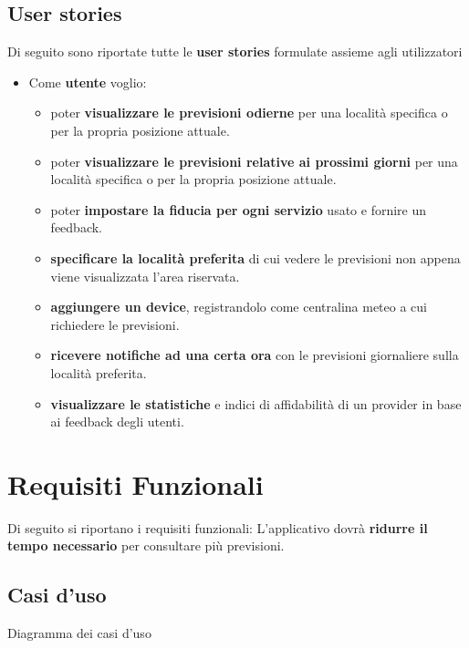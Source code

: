         \subsection{User stories}
        Di seguito sono riportate tutte le \textbf{user stories} formulate assieme agli utilizzatori
        \begin{itemize}
            \item Come \textbf{utente}
            voglio:
            \begin{itemize}
                \item poter \textbf{visualizzare le previsioni odierne} per una località specifica o per la propria posizione attuale.
                \item poter \textbf{visualizzare le previsioni relative ai prossimi giorni} per una località specifica o per la propria posizione attuale.
                \item poter \textbf{impostare la fiducia per ogni servizio} usato e fornire un feedback.
                \item \textbf{specificare la località preferita} di cui vedere le previsioni non appena viene visualizzata l'area riservata.
                \item \textbf{aggiungere un device}, registrandolo come centralina meteo a cui richiedere le previsioni.
                \item \textbf{ricevere notifiche ad una certa ora} con le previsioni giornaliere sulla località preferita.
                \item \textbf{visualizzare le statistiche} e indici di affidabilità di un provider in base ai feedback degli utenti.
                
            \end{itemize}
        \end{itemize}
            
	    
	\section{Requisiti Funzionali} %
	Di seguito si riportano i requisiti funzionali:
	L'applicativo dovrà \textbf{ridurre il tempo necessario} per consultare più previsioni.
	    \subsection{Casi d'uso}
        	 Diagramma dei casi d'uso
                    
